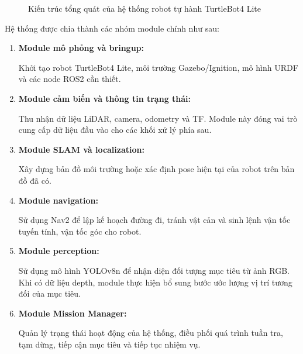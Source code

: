 \begin{figure}[H]
{
    }

    \caption{Kiến trúc tổng quát của hệ thống robot tự hành TurtleBot4 Lite}
    \label{fig:system-architecture}
\end{figure}

Hệ thống được chia thành các nhóm module chính như sau:


\begin{enumerate}
    \item \textbf{Module mô phỏng và bringup:}
    
    Khởi tạo robot TurtleBot4 Lite, môi trường Gazebo/Ignition, mô hình URDF và các node ROS2 cần thiết.
    
    \item \textbf{Module cảm biến và thông tin trạng thái:}
    
    Thu nhận dữ liệu LiDAR, camera, odometry và TF. Module này đóng vai trò cung cấp dữ liệu đầu vào cho các khối xử lý phía sau.
    
    \item \textbf{Module SLAM và localization:}
    
    Xây dựng bản đồ môi trường hoặc xác định pose hiện tại của robot trên bản đồ đã có.
    
    \item \textbf{Module navigation:}
    
    Sử dụng Nav2 để lập kế hoạch đường đi, tránh vật cản và sinh lệnh vận tốc tuyến tính, vận tốc góc cho robot.
    
    \item \textbf{Module perception:}
    
    Sử dụng mô hình YOLOv8n để nhận diện đối tượng mục tiêu từ ảnh RGB. Khi có dữ liệu depth, module thực hiện bổ sung bước ước lượng vị trí tương đối của mục tiêu.
    
    \item \textbf{Module Mission Manager:}
    
    Quản lý trạng thái hoạt động của hệ thống, điều phối quá trình tuần tra, tạm dừng, tiếp cận mục tiêu và tiếp tục nhiệm vụ.
\end{enumerate}

